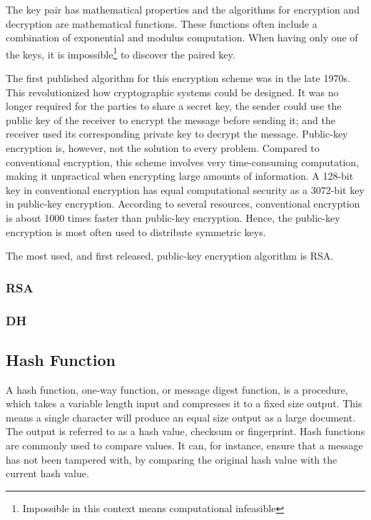 \documentclass[12pt,a4paper,titlepage]{report}
\begin{document}
The key pair has mathematical properties and the algorithms for encryption and decryption are mathematical functions. These functions often include a combination of exponential and modulus computation. When having only one of the keys, it is impossible\footnote{Impossible in this context means computational infeasible} to discover the paired key. 

The first published algorithm for this encryption scheme was in the late 1970s. This revolutionized how cryptographic systems could be designed. It was no longer required for the parties to share a secret key, the sender could use the public key of the receiver to encrypt the message before sending it; and the receiver used its corresponding private key to decrypt the message. Public-key encryption is, however, not the solution to every problem. Compared to conventional encryption, this scheme involves very time-consuming computation, making it unpractical when encrypting large amounts of information. A 128-bit key in conventional encryption has equal computational security as a 3072-bit key in public-key encryption. According to several resources\cite{pgp,javabeat,crashcourse}, conventional encryption is about 1000 times faster than public-key encryption. Hence, the public-key encryption is most often used to distribute symmetric keys. \cite{stallings,nistrecommendation}

The most used, and first released, public-key encryption algorithm is RSA.

\subsubsection{RSA}

\subsubsection{DH}


\subsection{Hash Function}
A hash function, one-way function, or message digest function, is a procedure, which takes a variable length input and compresses it to a fixed size output. This means a single character will produce an equal size output as a large document. The output is referred to as a hash value, checksum or fingerprint. Hash functions are commonly used to compare values. It can, for instance, ensure that a message has not been tampered with, by comparing the original hash value with the current hash value. 
\end{document}
